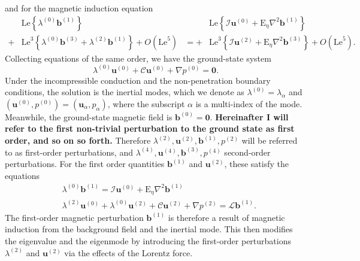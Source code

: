 %
and for the magnetic induction equation
%
\begin{equation}
\begin{aligned}
    &\mathrm{Le}\left\{\lambda^{(0)} \mathbf{b}^{(1)}\right\} & & \mathrm{Le} \left\{\mathcal{I} \mathbf{u}^{(0)} + \mathrm{E}_\eta \nabla^2 \mathbf{b}^{(1)}\right\} \\
    + &\mathrm{Le}^3 \left\{\lambda^{(0)} \mathbf{b}^{(3)} + \lambda^{(2)} \mathbf{b}^{(1)}\right\} + O\left(\mathrm{Le}^5\right) & = + & \mathrm{Le}^3 \left\{\mathcal{I} \mathbf{u}^{(2)} + \mathrm{E}_\eta \nabla^2 \mathbf{b}^{(3)}\right\} + O\left(\mathrm{Le}^5\right).
\end{aligned}
\end{equation}
%
Collecting equations of the same order, we have the ground-state system
%
\begin{equation}
    \lambda^{(0)} \mathbf{u}^{(0)} + \mathcal{C} \mathbf{u}^{(0)} + \nabla p^{(0)} = \mathbf{0}.
\end{equation}
%
Under the incompressible conduction and the non-penetration boundary conditions, the solution is the inertial modes, which we denote as $\lambda^{(0)} = \lambda_\alpha$ and $(\mathbf{u}^{(0)}, p^{(0)}) = (\mathbf{u}_{\alpha}, p_{\alpha})$, where the subscript $\alpha$ is a multi-index of the mode. Meanwhile, the ground-state magnetic field is $\mathbf{b}^{(0)} = \mathbf{0}$.
\textbf{Hereinafter I will refer to the first non-trivial perturbation to the ground state as first order, and so on so forth.} Therefore $\lambda^{(2)}, \mathbf{u}^{(2)}, \mathbf{b}^{(1)}, p^{(2)}$ will be referred to as first-order perturbations, and $\lambda^{(4)}, \mathbf{u}^{(4)}, \mathbf{b}^{(3)}, p^{(4)}$ second-order perturbations.
For the first order quantities $\mathbf{b}^{(1)}$ and $\mathbf{u}^{(2)}$, these satisfy the equations
%
\begin{equation}
\begin{aligned}
    &\lambda^{(0)} \mathbf{b}^{(1)} = \mathcal{I} \mathbf{u}^{(0)} + \mathrm{E}_\eta \nabla^2 \mathbf{b}^{(1)} \\
    &\lambda^{(2)} \mathbf{u}^{(0)} + \lambda^{(0)} \mathbf{u}^{(2)} + \mathcal{C} \mathbf{u}^{(2)} + \nabla p^{(2)} = \mathcal{L} \mathbf{b}^{(1)}.
\end{aligned}
\end{equation}
%
The first-order magnetic perturbation $\mathbf{b}^{(1)}$ is therefore a result of magnetic induction from the background field and the inertial mode. This then modifies the eigenvalue and the eigenmode by introducing the first-order perturbations $\lambda^{(2)}$ and $\mathbf{u}^{(2)}$ via the effects of the Lorentz force.
